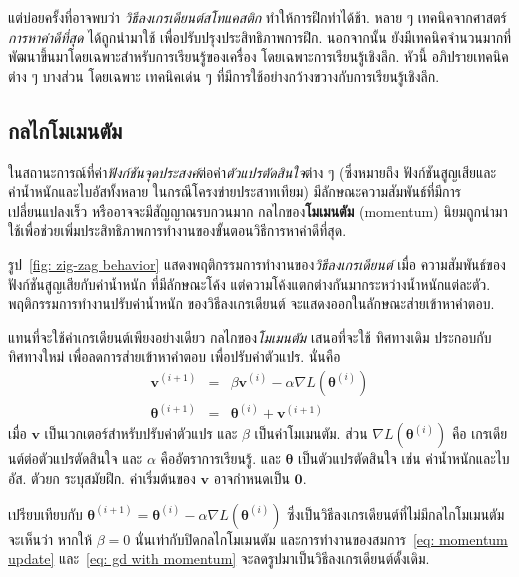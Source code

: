แต่บ่อยครั้งที่อาจพบว่า
\textit{วิธีลงเกรเดียนต์สโทแคสติก}
ทำให้การฝึกทำได้ช้า.
หลาย ๆ เทคนิคจากศาสตร์\textit{การหาค่าดีที่สุด}
ได้ถูกนำมาใช้
เพื่อปรับปรุงประสิทธิภาพการฝึก.
นอกจากนั้น 
ยังมีเทคนิคจำนวนมากที่พัฒนาขึ้นมาโดยเฉพาะสำหรับการเรียนรู้ของเครื่อง โดยเฉพาะการเรียนรู้เชิงลึก.
หัวนี้ อภิปรายเทคนิคต่าง ๆ บางส่วน 
โดยเฉพาะ
เทคนิคเด่น ๆ
ที่มีการใช้อย่างกว้างขวางกับการเรียนรู้เชิงลึก.

\subsection{กลไกโมเมนตัม}
\label{sec: momentum}

ในสถานะการณ์ที่ค่า\textit{ฟังก์ชันจุดประสงค์}ต่อค่า\textit{ตัวแปรตัดสินใจ}ต่าง ๆ
(ซึ่งหมายถึง ฟังก์ชันสูญเสียและค่าน้ำหนักและไบอัสทั้งหลาย ในกรณีโครงข่ายประสาทเทียม)
มีลักษณะความสัมพันธ์ที่มีการเปลี่ยนแปลงเร็ว
หรืออาจจะมีสัญญาณรบกวนมาก
กลไกของ\textbf{โมเมนตัม} (momentum\cite{Polyak1964})
นิยมถูกนำมาใช้เพื่อช่วยเพิ่มประสิทธิภาพการทำงานของขั้นตอนวิธีการหาค่าดีที่สุด.

รูป~\ref{fig: zig-zag behavior}
แสดงพฤติกรรมการทำงานของ\textit{วิธีลงเกรเดียนต์}
เมื่อ
ความสัมพันธ์ของฟังก์ชันสูญเสียกับค่าน้ำหนัก
ที่มีลักษณะโค้ง
แต่ความโค้งแตกต่างกันมากระหว่างน้ำหนักแต่ละตัว.
พฤติกรรมการทำงานปรับค่าน้ำหนัก
ของวิธีลงเกรเดียนต์
จะแสดงออกในลักษณะส่ายเข้าหาคำตอบ.

แทนที่จะใช้ค่าเกรเดียนต์เพียงอย่างเดียว
กลไกของ\textit{โมเมนตัม}
เสนอที่จะใช้
ทิศทางเดิม
ประกอบกับทิศทางใหม่
เพื่อลดการส่ายเข้าหาคำตอบ
เพื่อปรับค่าตัวแปร.
นั่นคือ
\begin{eqnarray}
\bm{v}^{(i+1)} &=&
\beta \bm{v}^{(i)} - \alpha 
\nabla L(\bm{\theta}^{(i)})
\label{eq: momentum update} \\ 
\bm{\theta}^{(i+1)} &=& \bm{\theta}^{(i)} + \bm{v}^{(i+1)} 
\label{eq: gd with momentum}
\end{eqnarray}
เมื่อ
$\bm{v}$ เป็นเวกเตอร์สำหรับปรับค่าตัวแปร
และ $\beta$ เป็นค่าโมเมนตัม.
ส่วน $\nabla L(\bm{\theta}^{(i)})$
คือ เกรเดียนต์ต่อตัวแปรตัดสินใจ
และ $\alpha$ คืออัตราการเรียนรู้. 
และ $\bm{\theta}$ เป็นตัวแปรตัดสินใจ เช่น ค่าน้ำหนักและไบอัส.
ตัวยก ระบุสมัยฝึก. %
ค่าเริ่มต้นของ $\bm{v}$ อาจกำหนดเป็น $\bm{0}$.

เปรียบเทียบกับ
$\bm{\theta}^{(i+1)} = \bm{\theta}^{(i)} -\alpha \nabla L(\bm{\theta}^{(i)})$ ซึ่งเป็นวิธีลงเกรเดียนต์ที่ไม่มีกลไกโมเมนตัม
จะเห็นว่า หากให้ $\beta = 0$ นั่นเท่ากับปิดกลไกโมเมนตัม และการทำงานของสมการ~\ref{eq: momentum update} และ~\ref{eq: gd with momentum} จะลดรูปมาเป็นวิธีลงเกรเดียนต์ดั้งเดิม.

